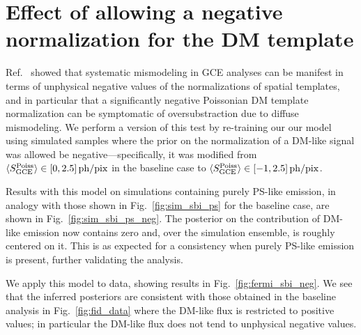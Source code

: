 \documentclass[prd,aps,10pt,nofootinbib,twocolumn,superscriptaddress,preprintnumbers,balancelastpage,longbibliography,floatfix]{revtex4-2}
\newcommand{\changes}[1]{{{\color{red}#1}}}
\begin{document}
\changes{\section{Effect of allowing a negative normalization for the DM template}
\label{app:negative_dm}

Ref.~\cite{Leane:2019xiy} showed that systematic mismodeling in GCE analyses can be manifest in terms of unphysical negative values of the normalizations of spatial templates, and in particular that a significantly negative Poissonian DM template normalization can be symptomatic of oversubstraction due to diffuse mismodeling. We perform a version of this test by re-training our our model using simulated samples where the prior on the normalization of a DM-like signal was allowed be negative---specifically, it was modified from $\langle S_{\rm GCE}^{\rm Poiss} \rangle \in [0, 2.5]\,\mathrm{ph/pix}$ in the baseline case to  $\langle S_{\rm GCE}^{\rm Poiss} \rangle \in [-1, 2.5]\,\mathrm{ph/pix}$. 

Results with this model on simulations containing purely PS-like emission, in analogy with those shown in Fig.~\ref{fig:sim_sbi_ps} for the baseline case, are shown in Fig.~\ref{fig:sim_sbi_ps_neg}. The posterior on the contribution of DM-like emission now contains zero and, over the simulation ensemble, is roughly centered on it. This is as expected for a consistency when purely PS-like emission is present, further validating the analysis.

We apply this model to \Fermi data, showing results in Fig.~\ref{fig:fermi_sbi_neg}. We see that the inferred posteriors are consistent with those obtained in the baseline analysis in Fig.~\ref{fig:fid_data} where the DM-like flux is restricted to positive values; in particular the DM-like flux does not tend to unphysical negative values.
}
\end{document}
